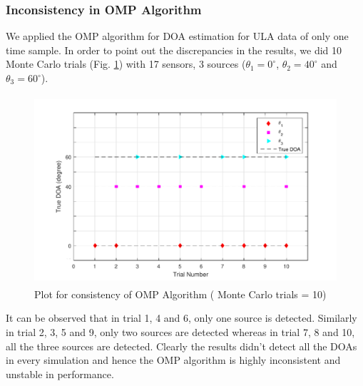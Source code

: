 \documentclass[12pt,a4paper]{article}
\theoremstyle{plain}
\theoremstyle{definition}
\begin{document}
\subsubsection{Inconsistency in OMP Algorithm}
We applied the OMP algorithm for DOA estimation for ULA data of only one time sample. In order to point out the discrepancies in the results, we did 10 Monte Carlo trials (Fig. \ref{figc1}) with 17 sensors, 3 sources ($\theta_1=0^{\circ}$, $\theta_2=40^{\circ}$ and $\theta_3=60^{\circ}$). 
\begin{figure}[h]
\centering
\includegraphics[height=7cm]{figs/Plot_7.pdf}
\caption{Plot for consistency of OMP Algorithm ( Monte Carlo trials = 10)}
\label{figc1}
\end{figure}

It can be observed that in trial 1, 4 and 6, only one source is detected. Similarly in trial 2, 3, 5 and 9, only two sources are detected whereas in trial 7, 8 and 10, all the three sources are detected. Clearly the results didn't detect all the DOAs in every simulation and hence the OMP algorithm is highly inconsistent and  unstable in performance.
\end{document}

